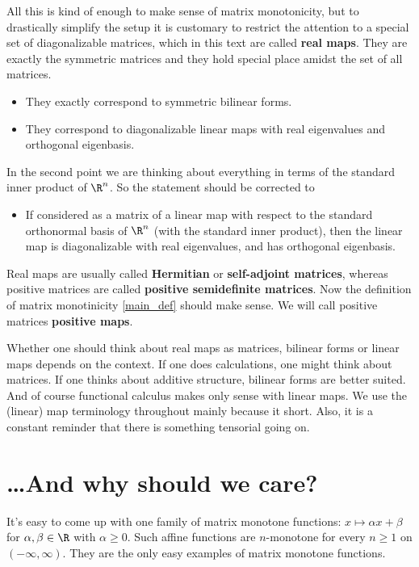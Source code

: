 All this is kind of enough to make sense of matrix monotonicity, but to drastically simplify the setup it is customary to restrict the attention to a special set of diagonalizable matrices, which in this text are called \textbf{real maps}. They are exactly the symmetric matrices and they hold special place amidst the set of all matrices.

\begin{itemize}
	\item They exactly correspond to symmetric bilinear forms.
	\item They correspond to diagonalizable linear maps with real eigenvalues and orthogonal eigenbasis.
\end{itemize}

In the second point we are thinking about everything in terms of the standard inner product of $\R^n$. So the statement should be corrected to

\begin{itemize}
	\item If considered as a matrix of a linear map with respect to the standard orthonormal basis of $\R^n$ (with the standard inner product), then the linear map is diagonalizable with real eigenvalues, and has orthogonal eigenbasis.
\end{itemize}

Real maps are usually called \textbf{Hermitian} or \textbf{self-adjoint matrices}, whereas positive matrices are called \textbf{positive semidefinite matrices}. Now the definition of matrix monotinicity \ref{main_def} should make sense. We will call positive matrices \textbf{positive maps}.

Whether one should think about real maps as matrices, bilinear forms or linear maps depends on the context. If one does calculations, one might think about matrices. If one thinks about additive structure, bilinear forms are better suited. And of course functional calculus makes only sense with linear maps. We use the (linear) map terminology throughout mainly because it short. Also, it is a constant reminder that there is something tensorial going on.

\section{\ldots And why should we care?}

It's easy to come up with one family of matrix monotone functions: $x \mapsto \alpha x + \beta$ for $\alpha, \beta \in \R$ with $\alpha \geq 0$. Such affine functions are $n$-monotone for every $n \geq 1$ on $(-\infty, \infty)$. They are the only easy examples of matrix monotone functions.

